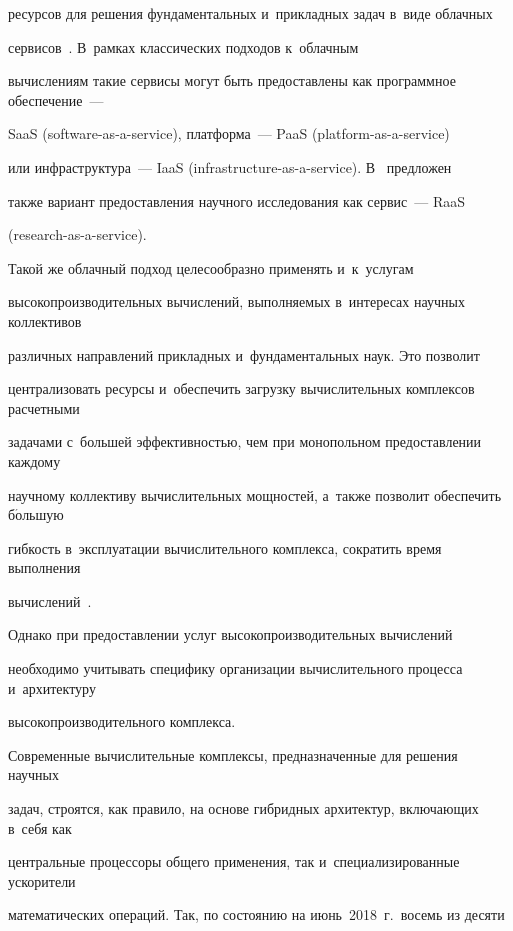 ресурсов для решения фундаментальных и~прикладных задач в~виде облачных 

сервисов~\cite{1-vol, 2-vol, 3-vol}. В~рамках классических подходов к~облачным 

вычислениям такие сервисы могут быть предоставлены как программное обеспечение~--- 

SaaS (software-as-a-service), платформа~--- PaaS (platform-as-a-service)

или инфраструктура~--- IaaS (infrastructure-as-a-service). В~\cite{4-vol, 5-vol} предложен 

также вариант предоставления научного исследования как сервис~--- RaaS

(research-as-a-service). 

      

      Такой же облачный подход целесообразно применять и~к~услугам 

высокопроизводительных вычислений, выполняемых в~интересах научных коллективов 

различных направлений прикладных и~фундаментальных наук. Это позволит 

централизовать ресурсы и~обеспечить загрузку вычислительных комплексов расчетными 

задачами с~большей эффективностью, чем при монопольном предоставлении каждому 

научному коллективу вычислительных мощностей, а~также позволит обеспечить б$\acute{\mbox{о}}$льшую 

гибкость в~эксплуатации вычислительного комплекса, сократить время выполнения 

вычислений~\cite{8-vol, 9-vol}.

      

      Однако при предоставлении услуг высокопроизводительных вычислений 

необходимо учитывать специфику организации вычислительного процесса и~архитектуру 

высокопроизводительного комплекса. 

      

      Современные вычислительные комплексы, предназначенные для решения научных 

задач, строятся, как правило, на основе гибридных архитектур, вклю\-ча\-ющих в~себя как 

центральные процессоры общего применения, так и~специализированные ускорители 

математических операций. Так, по состоянию на июнь~2018~г.\ восемь из десяти 

